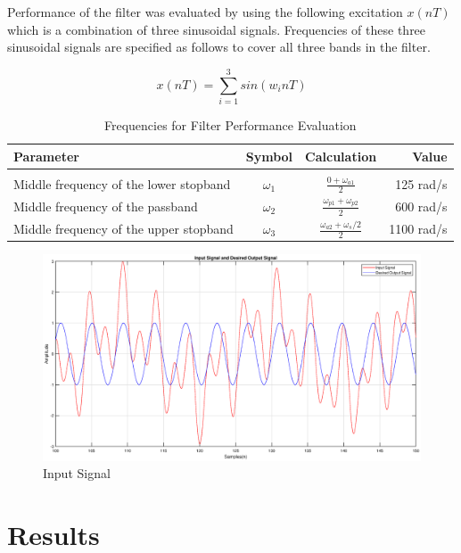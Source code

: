 \documentclass[a4paper,11pt]{article}%
\begin{document}
Performance of the filter was evaluated by using the following excitation $x(nT)$ which is a combination of three sinusoidal signals. Frequencies of these three sinusoidal signals are specified as follows to cover all three bands in the filter.

\[x(nT) = \sum_{i=1}^{3}sin(w_inT)\]

\begin{table}[!h]
	\centering
	
	\begin{tabular}{l c c r}
		\hline
	\textbf{Parameter}& \textbf{Symbol}& \textbf{Calculation}&\textbf{Value}\\\hline
	&&&\\
	Middle frequency of the lower stopband& $\omega_1$&$\frac{0+ \omega_{a1}}{2}$&125 rad/s\\
	Middle frequency of the passband &$\omega_2$&$\frac{\omega_{p1}+\omega_{p2}}{2}$&600 rad/s\\
	Middle frequency of the upper stopband& $\omega_3$&$\frac{\omega_{a2}+\omega_s/2}{2}$&1100 rad/s\\
	\hline\hline
	\end{tabular}
\caption{Frequencies for Filter Performance Evaluation}
\end{table}
\begin{figure}[!h]
	\centering
	\includegraphics[scale=0.4]{figures/in-signal}
	\caption{Input Signal}
\end{figure}

\pagebreak
\section{Results}
\end{document}
